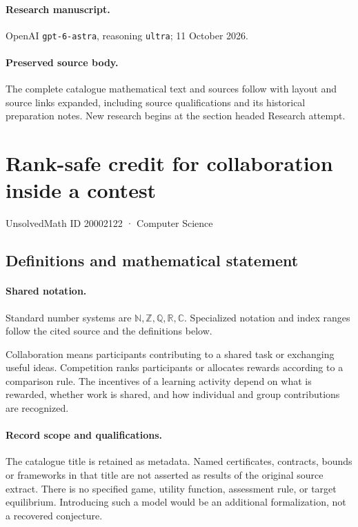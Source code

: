 \documentclass[11pt]{article}
\begin{document}
\paragraph{Research manuscript.} OpenAI \texttt{gpt-6-astra}, reasoning \texttt{ultra}; 11 October 2026.
\paragraph{Preserved source body.} The complete catalogue mathematical text and sources follow with layout and source links expanded, including source qualifications and its historical preparation notes. New research begins at the section headed Research attempt.

\section{Rank-safe credit for collaboration inside a contest}\label{20002122}
{\small UnsolvedMath ID 20002122 · Computer Science}
\subsection{Definitions and mathematical statement}

\paragraph{Shared notation.}Standard number systems are $\mathbb N,\mathbb Z,\mathbb Q,\mathbb R,\mathbb C$. Specialized notation and index ranges follow the cited source and the definitions below.


Collaboration means participants contributing to a shared task or exchanging useful ideas. Competition ranks participants or allocates rewards according to a comparison rule. The incentives of a learning activity depend on what is rewarded, whether work is shared, and how individual and group contributions are recognized.
\paragraph{Record scope and qualifications.}
The catalogue title is retained as metadata. Named certificates, contracts, bounds or frameworks in that title are not asserted as results of the original source extract.
There is no specified game, utility function, assessment rule, or target equilibrium. Introducing such a model would be an additional formalization, not a recovered conjecture.
\end{document}
